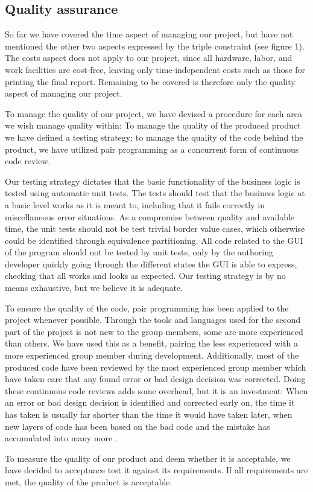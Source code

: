 \subsection{Quality assurance}

So far we have covered the time aspect of managing our project, but have not mentioned the other two aspects expressed by the triple constraint (see figure 1).
The costs aspect does not apply to our project, since all hardware, labor, and work facilities are cost-free, leaving only time-independent costs such as those for printing the final report.
Remaining to be covered is therefore only the quality aspect of managing our project.

To manage the quality of our project, we have devised a procedure for each area we wish manage quality within: To manage the quality of the produced product we have defined a testing strategy; to manage the quality of the code behind the product, we have utilized pair programming as a concurrent form of continuous code review.

Our testing strategy dictates that the basic functionality of the business logic is tested using automatic unit tests. The tests should test that the business logic at a basic level works as it is meant to, including that it fails correctly in miscellaneous error situations.
As a compromise between quality and available time, the unit tests should not be test trivial border value cases, which otherwise could be identified through equivalence partitioning.
All code related to the GUI of the program should not be tested by unit tests, only by the authoring developer quickly going through the different states the GUI is able to express, checking that all works and looks as expected.
Our testing strategy is by no means exhaustive, but we believe it is adequate.

To ensure the quality of the code, pair programming has been applied to the project whenever possible. Through the tools and languages used for the second part of the project is not new to the group members, some are more experienced than others.
We have used this as a benefit, pairing the less experienced with a more experienced group member during development. Additionally, most of the produced code have been reviewed by the most experienced group member which have taken care that any found error or bad design decision was corrected.
Doing these continuous code reviews adds some overhead, but it is an investment: When an error or bad design decision is identified and corrected early on, the time it has taken is usually far shorter than the time it would have taken later, when new layers of code has been based on the bad code and the mistake has accumulated into many more \cite[p. ?]{?}.

To measure the quality of our product and deem whether it is acceptable, we have decided to acceptance test it against its requirements. If all requirements are met, the quality of the product is acceptable.